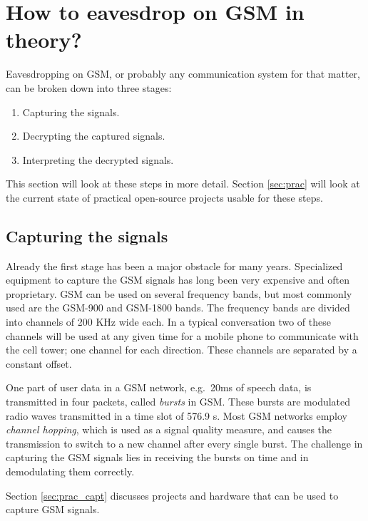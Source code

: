 \documentclass[a4paper,11pt]{llncs}
\begin{document}
\section{How to eavesdrop on GSM in theory?}\label{sec:theo}
Eavesdropping on GSM, or probably any communication system for that matter, can be broken down into three stages:
\begin{enumerate}
\item \label{cap} Capturing the signals.
\item \label{dec} Decrypting the captured signals.
\item \label{int} Interpreting the decrypted signals.
\end{enumerate}
This section will look at these steps in more detail. Section \ref{sec:prac} will look at the current state of practical open-source projects usable for these steps.

\subsection{Capturing the signals}\label{sec:th_capt}
Already the first stage has been a major obstacle for many years. Specialized equipment to capture the GSM signals has long been very expensive and often proprietary. GSM can be used on several frequency bands, but most commonly used are the GSM-900 and GSM-1800 bands. The frequency bands are divided into channels of 200 KHz wide each. In a typical conversation two of these channels will be used at any given time for a mobile phone to communicate with the cell tower; one channel for each direction. These channels are separated by a constant offset.

One part of user data in a GSM network, e.g.\ 20ms of speech data, is transmitted in four packets, called \textit{bursts} in GSM. These bursts are modulated radio waves transmitted in a time slot of 576.9 s. 
Most GSM networks employ \textit{channel hopping}, which is used as a signal quality measure, and causes the transmission to switch to a new channel after every single burst.
The challenge in capturing the GSM signals lies in receiving the bursts on time and in demodulating them correctly.

Section \ref{sec:prac_capt} discusses projects and hardware that can be used to capture GSM signals.
\end{document}
